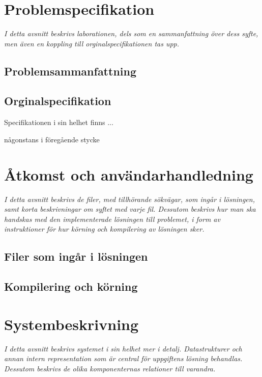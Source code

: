 \documentclass[12pt, a4paper]{article}
\begin{document}
\tableofcontents
	
\newpage


\section{Problemspecifikation}
		\emph{I detta avsnitt beskrivs laborationen, dels som en sammanfattning
			över dess syfte, men även en koppling till orginalspecifikationen
			tas upp.}

		\subsection{Problemsammanfattning}

		\subsection{Orginalspecifikation}
			Specifikationen i sin helhet finns ...

			någonstans i föregående stycke

	\section{Åtkomst och användarhandledning}
		\emph{I detta avsnitt beskrivs de filer, med tillhörande sökvägar,
			som ingår i lösningen, samt korta beskrivningar om syftet med
			varje fil. Dessutom beskrivs hur man ska handskas med den
			implementerade lösningen till problemet, i form av instruktioner
			för hur körning och kompilering av lösningen sker.}
	
		\subsection{Filer som ingår i lösningen}
			
			
		\subsection{Kompilering och körning}
			

	\section{Systembeskrivning}
		\emph{I detta avsnitt beskrivs systemet i sin helhet mer i detalj.
			Datastrukturer och annan intern representation som är central
			för uppgiftens lösning behandlas. Dessutom beskrivs de olika
			komponenternas relationer till varandra.}
\end{document}
